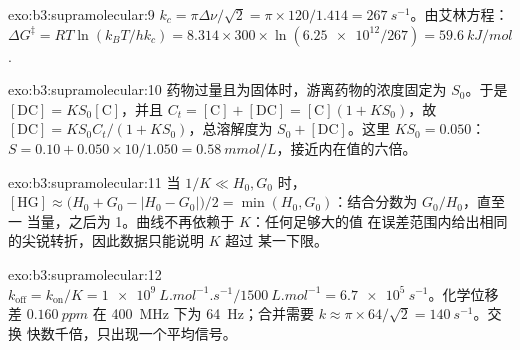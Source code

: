 \begin{solution}{exo:b3:supramolecular:9}
$k_c = \pi\Delta\nu/\sqrt2 = \pi \times 120/1.414 = \qty{267}{s^{-1}}$。由艾林方程：
$\Delta G^\ddagger = RT\ln(k_BT/hk_c) = 8.314 \times 300 \times \ln(\num{6.25e12}/267) = \qty{59.6}{kJ/mol}$.
\end{solution}

\begin{solution}{exo:b3:supramolecular:10}
药物过量且为固体时，游离药物的浓度固定为 $S_0$。于是 $[\mathrm{DC}] = KS_0[\mathrm C]$，并且
$C_t = [\mathrm C] + [\mathrm{DC}] = [\mathrm C](1 + KS_0)$，故 $[\mathrm{DC}] = KS_0C_t/(1 + KS_0)$，总溶解度为 $S_0 + [\mathrm{DC}]$。这里
$KS_0 = 0.050$：$S = 0.10 + 0.050 \times 10/1.050 = \qty{0.58}{mmol/L}$，接近内在值的六倍。
\end{solution}

\begin{solution}{exo:b3:supramolecular:11}
当 $1/K \ll H_0, G_0$ 时，$[\mathrm{HG}] \approx \bigl(H_0 + G_0 - |H_0 - G_0|\bigr)/2 = \min(H_0, G_0)$：结合分数为 $G_0/H_0$，直至一
当量，之后为 1。曲线不再依赖于 $K$：任何足够大的值
在误差范围内给出相同的尖锐转折，因此数据只能说明 $K$ 超过
某一下限。
\end{solution}

\begin{solution}{exo:b3:supramolecular:12}
$k_{\mathrm{off}} = k_{\mathrm{on}}/K = \qty{1e9}{L.mol^{-1}.s^{-1}}/\qty{1500}{L.mol^{-1}} = \qty{6.7e5}{s^{-1}}$。化学位移差
$\qty{0.160}{ppm}$ 在 \qty{400}{MHz} 下为 \qty{64}{Hz}；合并需要 $k \approx \pi \times 64/\sqrt2 = \qty{140}{s^{-1}}$。交换
快数千倍，只出现一个平均信号。
\end{solution}

